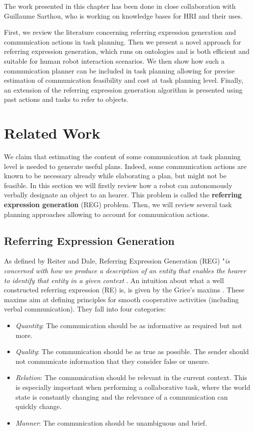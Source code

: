 \documentclass[a4paper,11pt,twoside]{StyleThese}
\begin{document}
The work presented in this chapter has been done in close collaboration with Guillaume Sarthou, who is working on knowledge bases for HRI and their uses.

First, we review the literature concerning referring expression generation and communication actions in task planning. Then we present a novel approach for referring expression generation, which runs on ontologies and is both efficient and suitable for human robot interaction scenarios. We then show how such a communication planner can be included in task planning allowing for precise estimation of communication feasibility and cost at task planning level. Finally, an extension of the referring expression generation algorithm is presented using past actions and tasks to refer to objects.

\section{Related Work}
We claim that estimating the content of some communication at task planning level is needed to generate useful plans. Indeed, some communication actions are known to be necessary already while elaborating a plan, but might not be feasible.
In this section we will firstly review how a robot can autonomously verbally designate an object to an hearer. This problem is called the \textbf{referring expression generation} (REG) problem.
Then, we will review several task planning approaches allowing to account for communication actions.

\subsection{Referring Expression Generation}
As defined by Reiter and Dale, Referring Expression Generation (REG) "\textit{is concerned with how we produce a description of an entity that enables the hearer to identify that entity in a given context} \cite{reiter1997building}. An intuition about what a well constructed referring expression (RE) is, is given by the Grice's maxims \cite{grice1975logic}. These maxims aim at defining principles for smooth cooperative activities (including verbal communication). They fall into four categories:
\begin{itemize}
\item \textit{Quantity}: The communication should be as informative as required but not more.
\item \textit{Quality}: The communication should be as true as possible. The sender should not communicate information that they consider false or unsure.
\item \textit{Relation}: The communication should be relevant in the current context. This is especially important when performing a collaborative task, where the world state is constantly changing and the relevance of a communication can quickly change.
\item \textit{Manner}: The communication should be unambiguous and brief.
\end{itemize}
\end{document}
